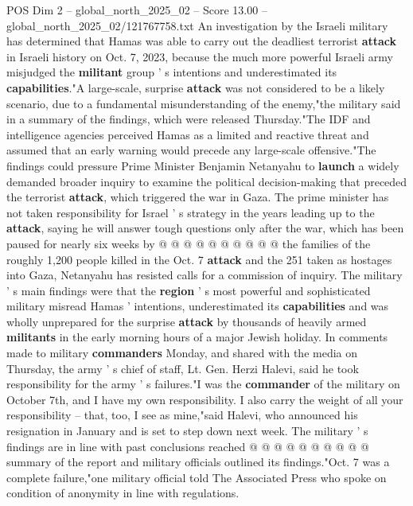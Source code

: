 \begin{textsample}{POS Dim 2 – global\_north\_2025\_02 – Score 13.00 – global\_north\_2025\_02/121767758.txt}  \label{ex:f2_pos_438}
An investigation by the Israeli military has determined that Hamas was able to carry out the deadliest terrorist \textbf{attack} in Israeli history on Oct. 7, 2023, because the much more powerful Israeli army misjudged the \textbf{militant} group ' s intentions and underestimated its \textbf{capabilities}."A large-scale, surprise \textbf{attack} was not considered to be a likely scenario, due to a fundamental misunderstanding of the enemy,"the military said in a summary of the findings, which were released Thursday."The IDF and intelligence agencies perceived Hamas as a limited and reactive threat and assumed that an early warning would precede any large-scale offensive."The findings could pressure Prime Minister Benjamin Netanyahu to \textbf{launch} a widely demanded broader inquiry to examine the political decision-making that preceded the terrorist \textbf{attack}, which triggered the war in Gaza.
The prime minister has not taken responsibility for Israel ' s strategy in the years leading up to the \textbf{attack}, saying he will answer tough questions only after the war, which has been paused for nearly six weeks by @ @ @ @ @ @ @ @ @ @ the families of the roughly 1,200 people killed in the Oct. 7 \textbf{attack} and the 251 taken as hostages into Gaza, Netanyahu has resisted calls for a commission of inquiry.
The military ' s main findings were that the \textbf{region} ' s most powerful and sophisticated military misread Hamas ' intentions, underestimated its \textbf{capabilities} and was wholly unprepared for the surprise \textbf{attack} by thousands of heavily armed \textbf{militants} in the early morning hours of a major Jewish holiday.
In comments made to military \textbf{commanders} Monday, and shared with the media on Thursday, the army ' s chief of staff, Lt.
Gen.
Herzi Halevi, said he took responsibility for the army ' s failures."I was the \textbf{commander} of the military on October 7th, and I have my own responsibility.
I also carry the weight of all your responsibility -- that, too, I see as mine,"said Halevi, who announced his resignation in January and is set to step down next week.
The military ' s findings are in line with past conclusions reached @ @ @ @ @ @ @ @ @ @ summary of the report and military officials outlined its findings."Oct. 7 was a complete failure,"one military official told The Associated Press who spoke on condition of anonymity in line with regulations.

\end{textsample}
